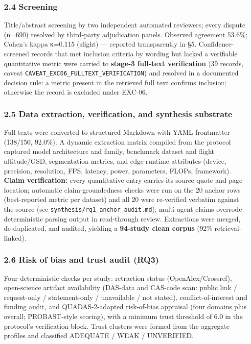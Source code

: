 \documentclass[11pt]{article}
\begin{document}
\subsubsection{2.4 Screening}\label{screening}

Title/abstract screening by two independent automated reviewers; every
dispute (n=690) resolved by third-party adjudication panels. Observed
agreement 53.6\%; Cohen's kappa κ=0.115 (slight) --- reported
transparently in §5. Confidence-screened records that met inclusion
criteria by wording but lacked a verifiable quantitative metric were
carried to \textbf{stage-3 full-text verification} (39 records, caveat
\texttt{CAVEAT\_EXC06\_FULLTEXT\_VERIFICATION}) and resolved in a
documented decision rule: a metric present in the retrieved full text
confirms inclusion; otherwise the record is excluded under EXC-06.

\subsubsection{2.5 Data extraction, verification, and synthesis
substrate}\label{data-extraction-verification-and-synthesis-substrate}

Full texts were converted to structured Markdown with YAML frontmatter
(138/150, 92.0\%). A dynamic extraction matrix compiled from the
protocol captured model architecture and family, benchmark dataset and
flight altitude/GSD, segmentation metrics, and edge-runtime attributes
(device, precision, resolution, FPS, latency, power, parameters, FLOPs,
framework). \textbf{Claim verification:} every quantitative entry
carries its source quote and page location; automatic claim-groundedness
checks were run on the 20 anchor rows (best-reported metric per dataset)
and all 20 were re-verified verbatim against the source (see
\texttt{synthesis/rq1\_anchor\_audit.md}); multi-agent claims overrode
deterministic parsing output in read-through review. Extractions were
merged, de-duplicated, and audited, yielding a \textbf{94-study clean
corpus} (92\% retrieval-linked).

\subsubsection{2.6 Risk of bias and trust audit
(RQ3)}\label{risk-of-bias-and-trust-audit-rq3}

Four deterministic checks per study: retraction status
(OpenAlex/Crossref), open-science artifact availability (DAS-data and
CAS-code scan: public link / request-only / statement-only / unavailable
/ not stated), conflict-of-interest and funding audit, and
QUADAS-2-adapted risk-of-bias appraisal (four domains plus overall;
PROBAST-style scoring), with a minimum trust threshold of 6.0 in the
protocol's verification block. Trust clusters were formed from the
aggregate profiles and classified ADEQUATE / WEAK / UNVERIFIED.
\end{document}
